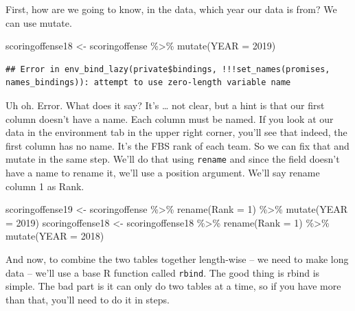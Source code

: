 \documentclass[
]{book}
\newenvironment{Shaded}{\begin{snugshade}}{\end{snugshade}}
\newcommand{\AttributeTok}[1]{\textcolor[rgb]{0.77,0.63,0.00}{#1}}
\newcommand{\DecValTok}[1]{\textcolor[rgb]{0.00,0.00,0.81}{#1}}
\newcommand{\FunctionTok}[1]{\textcolor[rgb]{0.00,0.00,0.00}{#1}}
\newcommand{\NormalTok}[1]{#1}
\newcommand{\OtherTok}[1]{\textcolor[rgb]{0.56,0.35,0.01}{#1}}
\newcommand{\SpecialCharTok}[1]{\textcolor[rgb]{0.00,0.00,0.00}{#1}}
\begin{document}
First, how are we going to know, in the data, which year our data is from? We can use mutate.

\begin{Shaded}
\begin{Highlighting}[]
\NormalTok{scoringoffense18 }\OtherTok{\textless{}{-}}\NormalTok{ scoringoffense }\SpecialCharTok{\%\textgreater{}\%} \FunctionTok{mutate}\NormalTok{(}\AttributeTok{YEAR =} \DecValTok{2019}\NormalTok{)}
\end{Highlighting}
\end{Shaded}

\begin{verbatim}
## Error in env_bind_lazy(private$bindings, !!!set_names(promises, names_bindings)): attempt to use zero-length variable name
\end{verbatim}

Uh oh. Error. What does it say? It's \ldots{} not clear, but a hint is that our first column doesn't have a name. Each column must be named. If you look at our data in the environment tab in the upper right corner, you'll see that indeed, the first column has no name. It's the FBS rank of each team. So we can fix that and mutate in the same step. We'll do that using \texttt{rename} and since the field doesn't have a name to rename it, we'll use a position argument. We'll say rename column 1 as Rank.

\begin{Shaded}
\begin{Highlighting}[]
\NormalTok{scoringoffense19 }\OtherTok{\textless{}{-}}\NormalTok{ scoringoffense }\SpecialCharTok{\%\textgreater{}\%} \FunctionTok{rename}\NormalTok{(}\AttributeTok{Rank =} \DecValTok{1}\NormalTok{) }\SpecialCharTok{\%\textgreater{}\%} \FunctionTok{mutate}\NormalTok{(}\AttributeTok{YEAR =} \DecValTok{2019}\NormalTok{)}
\NormalTok{scoringoffense18 }\OtherTok{\textless{}{-}}\NormalTok{ scoringoffense18 }\SpecialCharTok{\%\textgreater{}\%} \FunctionTok{rename}\NormalTok{(}\AttributeTok{Rank =} \DecValTok{1}\NormalTok{) }\SpecialCharTok{\%\textgreater{}\%} \FunctionTok{mutate}\NormalTok{(}\AttributeTok{YEAR =} \DecValTok{2018}\NormalTok{)}
\end{Highlighting}
\end{Shaded}

And now, to combine the two tables together length-wise -- we need to make long data -- we'll use a base R function called \texttt{rbind}. The good thing is rbind is simple. The bad part is it can only do two tables at a time, so if you have more than that, you'll need to do it in steps.
\end{document}
